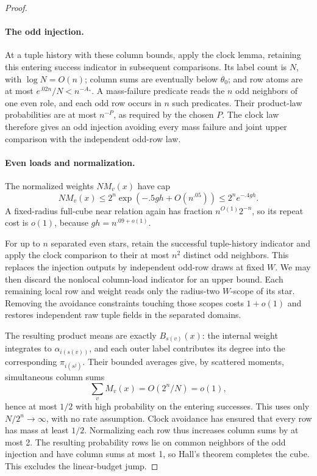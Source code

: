 \begin{proof}
\paragraph{The odd injection.}
At a tuple history with these column bounds, apply the clock lemma, retaining this entering success indicator in subsequent comparisons. Its label count is \(N\), with \(\log N=O(n)\); column sums are eventually below \(\theta_0\); and row atoms are at most \(e^{.02n}/N<n^{-A_*}\). A mass-failure predicate reads the \(n\) odd neighbors of one even role, and each odd row occurs in \(n\) such predicates. Their product-law probabilities are at most \(n^{-P}\), as required by the chosen \(P\). The clock law therefore gives an odd injection avoiding every mass failure and joint upper comparison with the independent odd-row law.

\paragraph{Even loads and normalization.}
The normalized weights \(NM_v(x)\) have cap
\[
 N M_v(x)\le2^n\exp(-.5gh+O(n^{.05}))
               \le2^ne^{-.4gh}.
\]
A fixed-radius full-cube near relation again has fraction \(n^{O(1)}2^{-n}\), so its repeat cost is \(o(1)\), because \(gh=n^{.09+o(1)}\).

For up to \(n\) separated even stars, retain the successful tuple-history indicator and apply the clock comparison to their at most \(n^2\) distinct odd neighbors. This replaces the injection outputs by independent odd-row draws at fixed \(W\). We may then discard the nonlocal column-load indicator for an upper bound. Each remaining local row and weight reads only the radius-two \(W\)-scope of its star. Removing the avoidance constraints touching those scopes costs \(1+o(1)\) and restores independent raw tuple fields in the separated domains.

The resulting product means are exactly \(B_{s(v)}(x)\): the internal weight integrates to \(\alpha_{i(s(v))}\), and each outer label contributes its degree into the corresponding \(\pi_{i(s^j)}\). Their bounded averages give, by scattered moments, simultaneous column sums
\[
 \sum_vM_v(x)=O(2^n/N)=o(1),
\]
hence at most \(1/2\) with high probability on the entering successes. This uses only \(N/2^n\to\infty\), with no rate assumption. Clock avoidance has ensured that every row has mass at least \(1/2\). Normalizing each row thus increases column sums by at most 2. The resulting probability rows lie on common neighbors of the odd injection and have column sums at most 1, so Hall's theorem completes the cube. This excludes the linear-budget jump.

\end{proof}

